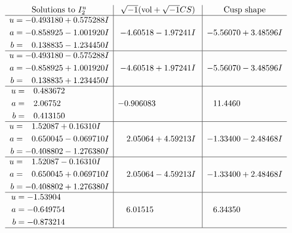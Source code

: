 \documentclass[1p]{elsarticle_modified}
\theoremstyle{definition}
\newcommand{\I}{\sqrt{-1}}
\begin{document}
$$\begin{array}{c|c|c}  
\text{Solutions to }I^u_{2}& \I (\text{vol} + \sqrt{-1}CS) & \text{Cusp shape}\\
 \hline 
\begin{aligned}
u &= -0.493180 + 0.575288 I \\
a &= -0.858925 - 1.001920 I \\
b &= \phantom{-}0.138835 - 1.234450 I\end{aligned}
 & -4.60518 - 1.97241 I & -5.56070 + 3.48596 I \\ \hline\begin{aligned}
u &= -0.493180 - 0.575288 I \\
a &= -0.858925 + 1.001920 I \\
b &= \phantom{-}0.138835 + 1.234450 I\end{aligned}
 & -4.60518 + 1.97241 I & -5.56070 - 3.48596 I \\ \hline\begin{aligned}
u &= \phantom{-}0.483672\phantom{ +0.000000I} \\
a &= \phantom{-}2.06752\phantom{ +0.000000I} \\
b &= \phantom{-}0.413150\phantom{ +0.000000I}\end{aligned}
 & -0.906083\phantom{ +0.000000I} & \phantom{-}11.4460\phantom{ +0.000000I} \\ \hline\begin{aligned}
u &= \phantom{-}1.52087 + 0.16310 I \\
a &= \phantom{-}0.650045 - 0.069710 I \\
b &= -0.408802 - 1.276380 I\end{aligned}
 & \phantom{-}2.05064 + 4.59213 I & -1.33400 - 2.48468 I \\ \hline\begin{aligned}
u &= \phantom{-}1.52087 - 0.16310 I \\
a &= \phantom{-}0.650045 + 0.069710 I \\
b &= -0.408802 + 1.276380 I\end{aligned}
 & \phantom{-}2.05064 - 4.59213 I & -1.33400 + 2.48468 I \\ \hline\begin{aligned}
u &= -1.53904\phantom{ +0.000000I} \\
a &= -0.649754\phantom{ +0.000000I} \\
b &= -0.873214\phantom{ +0.000000I}\end{aligned}
 & \phantom{-}6.01515\phantom{ +0.000000I} & \phantom{-}6.34350\phantom{ +0.000000I}\\
 \hline 
 \end{array}$$\newpage
\end{document}
